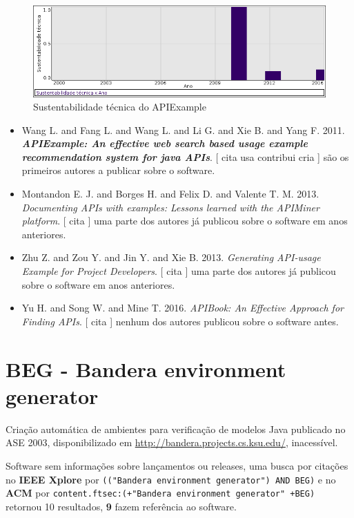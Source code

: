 \begin{figure}[h]
  \center
  \includegraphics[scale=0.50]{result-documents/charts/apiexample.png}
  \caption{Sustentabilidade técnica do APIExample}
\end{figure}


\begin{itemize}
\item Wang L. and Fang L. and Wang L. and Li G. and Xie B. and Yang F.
      2011.
        \textbf{\textit{ APIExample: An effective web search based usage example recommendation system for java APIs}}.
      [
          cita
          usa
          contribui
          cria
      ]
são os primeiros autores a publicar sobre o software.
\item Montandon E. J. and Borges H. and Felix D. and Valente T. M.
      2013.
        \textit{ Documenting APIs with examples: Lessons learned with the APIMiner platform}.
      [
          cita
      ]
uma parte dos autores já publicou sobre o software em anos anteriores.
\item Zhu Z. and Zou Y. and Jin Y. and Xie B.
      2013.
        \textit{ Generating API-usage Example for Project Developers}.
      [
          cita
      ]
uma parte dos autores já publicou sobre o software em anos anteriores.
\item Yu H. and Song W. and Mine T.
      2016.
        \textit{ APIBook: An Effective Approach for Finding APIs}.
      [
          cita
      ]
nenhum dos autores publicou sobre o software antes.
\end{itemize}
\section{BEG - Bandera environment generator}

Criação automática de ambientes para verificação de modelos Java
publicado no ASE 2003,
disponibilizado em \url{http://bandera.projects.cs.ksu.edu/},
inacessível.

Software sem informações sobre lançamentos ou releases,
uma busca por citações no {\bf IEEE Xplore} por
\texttt{(("Bandera environment generator") AND BEG)}
e no {\bf ACM} por
\texttt{content.ftsec:(+"Bandera environment generator" +BEG)}
retornou
10 resultados,
{\bf 9} fazem referência ao software.


